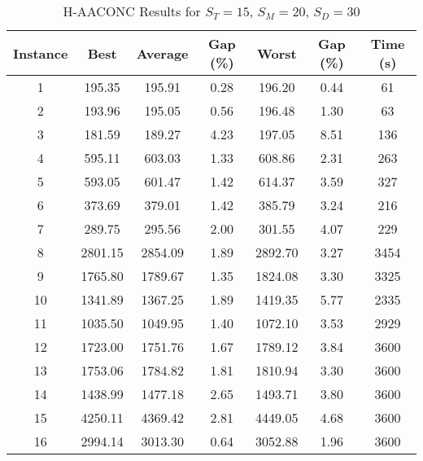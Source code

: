 \begin{table}[h]
	\centering
	\caption{H-AACONC Results for $S_T=15$, $S_M=20$, $S_D=30$}
	\begin{tabular}{@{}ccccccc@{}}
		\midrule
		\textbf{Instance} & \textbf{Best} & \textbf{Average} & \textbf{Gap (\%)} & \textbf{Worst} & \textbf{Gap (\%)} & \textbf{Time (s)} \\ \midrule
		1  & 195.35 & 195.91 & 0.28 & 196.20 & 0.44 & 61   \\ \midrule
		2  & 193.96 & 195.05 & 0.56 & 196.48 & 1.30 & 63 \\ \midrule
		3  & 181.59 & 189.27 & 4.23 & 197.05 & 8.51 & 136 \\ \midrule
		4  & 595.11 & 603.03 & 1.33 & 608.86 & 2.31 & 263 \\ \midrule
		5  & 593.05 & 601.47 & 1.42 & 614.37 & 3.59 & 327 \\ \midrule
		6  & 373.69 & 379.01 & 1.42 & 385.79 & 3.24 & 216 \\ \midrule
		7  & 289.75 & 295.56 & 2.00 & 301.55 & 4.07 & 229 \\ \midrule
		8  & 2801.15 & 2854.09 & 1.89 & 2892.70 & 3.27 & 3454 \\ \midrule
		9  & 1765.80 & 1789.67 & 1.35 & 1824.08 & 3.30 & 3325 \\ \midrule
		10 & 1341.89 & 1367.25 & 1.89 & 1419.35 & 5.77 & 2335 \\ \midrule
		11 & 1035.50 & 1049.95 & 1.40 & 1072.10 & 3.53 & 2929 \\ \midrule
		12 & 1723.00 & 1751.76 & 1.67 & 1789.12 & 3.84 & 3600 \\ \midrule
		13 & 1753.06 & 1784.82 & 1.81 & 1810.94 & 3.30 & 3600 \\ \midrule
		14 & 1438.99 & 1477.18 & 2.65 & 1493.71 & 3.80 & 3600 \\ \midrule
		15 & 4250.11 & 4369.42 & 2.81 & 4449.05 & 4.68 & 3600 \\ \midrule
		16 & 2994.14 & 3013.30 & 0.64 & 3052.88 & 1.96 & 3600 \\ \midrule
	\end{tabular}
	\label{table:ACO_15-20-30}
\end{table}
